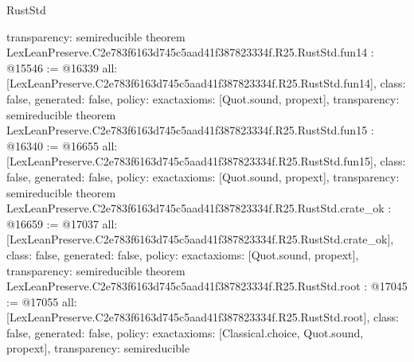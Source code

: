 \begin{lexlean}{RustStd}
\begin{coremodule}
{  transparency: semireducible
}
theorem LexLeanPreserve.C2e783f6163d745c5aad41f387823334f.R25.RustStd.fun14 : @15546 := @16339 {
  all: [LexLeanPreserve.C2e783f6163d745c5aad41f387823334f.R25.RustStd.fun14],
  class: false,
  generated: false,
  policy: exact{axioms: [Quot.sound, propext]},
  transparency: semireducible
}
theorem LexLeanPreserve.C2e783f6163d745c5aad41f387823334f.R25.RustStd.fun15 : @16340 := @16655 {
  all: [LexLeanPreserve.C2e783f6163d745c5aad41f387823334f.R25.RustStd.fun15],
  class: false,
  generated: false,
  policy: exact{axioms: [Quot.sound, propext]},
  transparency: semireducible
}
theorem LexLeanPreserve.C2e783f6163d745c5aad41f387823334f.R25.RustStd.crate_ok : @16659 := @17037 {
  all: [LexLeanPreserve.C2e783f6163d745c5aad41f387823334f.R25.RustStd.crate_ok],
  class: false,
  generated: false,
  policy: exact{axioms: [Quot.sound, propext]},
  transparency: semireducible
}
theorem LexLeanPreserve.C2e783f6163d745c5aad41f387823334f.R25.RustStd.root : @17045 := @17055 {
  all: [LexLeanPreserve.C2e783f6163d745c5aad41f387823334f.R25.RustStd.root],
  class: false,
  generated: false,
  policy: exact{axioms: [Classical.choice, Quot.sound, propext]},
  transparency: semireducible
}


\end{coremodule}
\end{lexlean}
